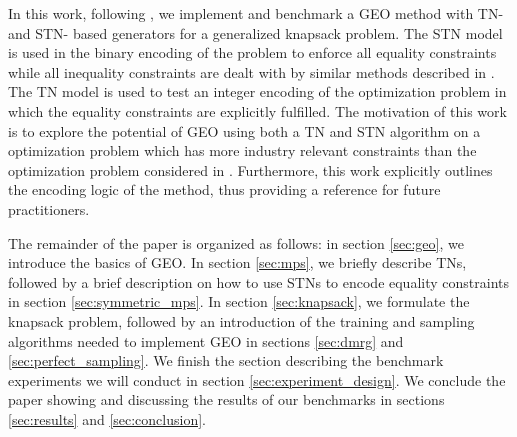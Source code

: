In this work, following \cite{Alcazar2024, lopezpiqueres2023symmetric}, we implement and benchmark a GEO method with TN- and STN- based generators for a generalized knapsack problem.  The STN model is used in the binary encoding of the problem to enforce all equality constraints while all inequality constraints are dealt with by similar methods described in \cite{banner2023quantuminspiredoptimizationindustrial}. The TN model is used to test an integer encoding of the optimization problem in which the equality constraints are explicitly fulfilled.  The motivation of this work is to explore the potential of GEO  using  both a TN and STN algorithm on a optimization problem which has more industry relevant constraints than the optimization problem considered in \cite{Alcazar2024, lopezpiqueres2023symmetric}.  Furthermore, this work explicitly outlines the encoding logic of the method, thus providing a reference for future practitioners.

The remainder of the paper is organized as follows: in section \ref{sec:geo}, we introduce the basics of GEO. In section \ref{sec:mps}, we briefly describe TNs, followed by a brief description on how to use STNs to encode equality constraints in section \ref{sec:symmetric_mps}. In section \ref{sec:knapsack}, we formulate the knapsack problem, followed by an introduction of the training and sampling algorithms needed to implement GEO in sections \ref{sec:dmrg} and \ref{sec:perfect_sampling}. We finish the section describing the benchmark experiments we will conduct in section \ref{sec:experiment_design}. We conclude the paper showing and discussing the results of our benchmarks in sections \ref{sec:results} and \ref{sec:conclusion}.